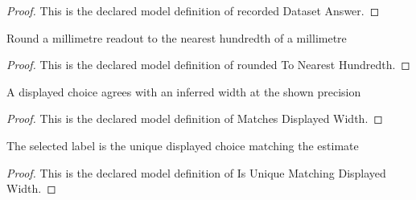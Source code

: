 \begin{proof}
  This is the declared model definition of recorded Dataset Answer.
\end{proof}
\begin{definition}
  \label{def:physics:phyx-mini-0249:phyxminiproblems-problemphyxmini0249-roundedtonearesthundredth}
  Round a millimetre readout to the nearest hundredth of a millimetre
\end{definition}
\begin{proof}
  This is the declared model definition of rounded To Nearest Hundredth.
\end{proof}
\begin{definition}
  \label{def:physics:phyx-mini-0249:phyxminiproblems-problemphyxmini0249-matchesdisplayedwidth}
  A displayed choice agrees with an inferred width at the shown precision
\end{definition}
\begin{proof}
  This is the declared model definition of Matches Displayed Width.
\end{proof}
\begin{definition}
  \label{def:physics:phyx-mini-0249:phyxminiproblems-problemphyxmini0249-isuniquematchingdisplayedwidth}
  The selected label is the unique displayed choice matching the estimate
\end{definition}
\begin{proof}
  This is the declared model definition of Is Unique Matching Displayed Width.
\end{proof}

